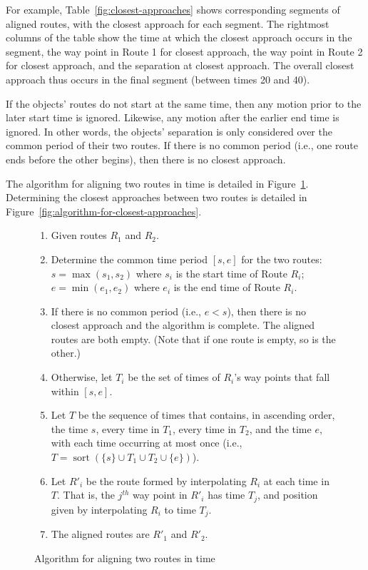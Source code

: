 \documentclass[times,12pt]{article}
\DeclareMathOperator{\sort}{sort}
\begin{document}
For example, Table~\ref{fig:closest-approaches} shows corresponding segments of aligned routes, with the closest approach for each segment. The rightmost columns of the table show the time at which the closest approach occurs in the segment, the way point in Route 1 for closest approach, the way point in Route 2 for closest approach, and the separation at closest approach. The overall closest approach thus occurs in the final segment (between times 20 and 40).

If the objects' routes do not start at the same time, then any motion prior to the later start time is ignored. Likewise, any motion after the earlier end time is ignored. In other words, the objects' separation is only considered over the common period of their two routes. If there is no common period (i.e., one route ends before the other begins), then there is no closest approach.

The algorithm for aligning two routes in time is detailed in Figure~\ref{fig:algorithm-for-aligning-routes}. Determining the closest approaches between two routes is detailed in Figure~\ref{fig:algorithm-for-closest-approaches}.

\begin{figure}[htb]
	\begin{enumerate}
		\item Given routes $R_1$ and $R_2$.
		
		\item Determine the common time period $[s, e]$ for the two routes: $s = \max(s_1, s_2)$ where $s_i$ is the start time of Route $R_i$; $e = \min(e_1, e_2)$ where $e_i$ is the end time of Route $R_i$.
		
		\item If there is no common period (i.e., $e < s$), then there is no closest approach and the algorithm is complete. The aligned routes are both empty. (Note that if one route is empty, so is the other.)
		
		\item Otherwise, let $T_i$ be the set of times of $R_i$'s way points that fall within $[s, e]$.
			
		\item Let $T$ be the sequence of times that contains, in ascending order, the time $s$, every time in $T_1$, every time in $T_2$, and the time $e$, with each time occurring at most once (i.e., $T = \sort(\{s\} \cup T_1 \cup T_2 \cup \{e\})$).
				
		\item Let $R'_i$ be the route formed by interpolating $R_i$ at each time in $T$. That is, the $j^{th}$ way point in $R'_i$ has time $T_j$, and position given by interpolating $R_i$ to time $T_j$.
		
		\item The aligned routes are $R'_1$ and $R'_2$.
	\end{enumerate}
\caption{Algorithm for aligning two routes in time}
\label{fig:algorithm-for-aligning-routes}
\end{figure}
\end{document}
